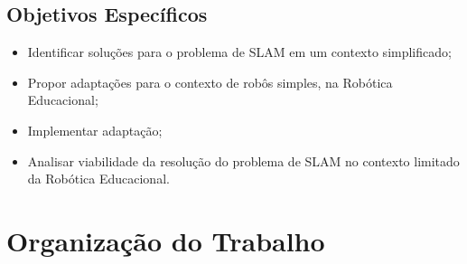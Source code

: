 \subsection{Objetivos Específicos}

\begin{itemize}
		\item Identificar soluções para o problema de SLAM em um contexto simplificado;
		\item Propor adaptações para o contexto de robôs simples, na Robótica Educacional;
		\item Implementar adaptação;
		\item Analisar viabilidade da resolução do problema de SLAM no contexto limitado da Robótica Educacional.
	\end{itemize}

\section{Organização do Trabalho}
